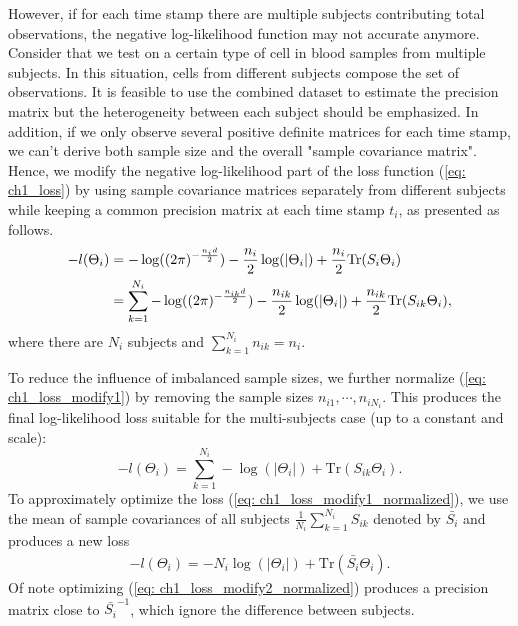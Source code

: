 However, if for each time stamp there are multiple subjects contributing total observations, 
the negative log-likelihood function may not accurate anymore. 
Consider that we test on a certain type of cell in blood samples from multiple subjects. 
In this situation, cells from different subjects compose the set of observations. 
It is feasible to use the combined dataset to estimate the precision matrix but the heterogeneity between each subject should be emphasized. 
In addition, if we only observe several positive definite matrices for each time stamp, 
we can't derive both sample size and the overall "sample covariance matrix". 
Hence, we modify the negative log-likelihood part of the loss function (\ref{eq: ch1_loss}) by 
using sample covariance matrices separately from different subjects while keeping a common precision matrix at each time stamp $t_i$,  
as presented as follows. 
\begin{align}
    \label{eq: ch1_loss_modify1}
    -l(\Theta_i) &= -\log((2\pi)^{-\frac{n_id}{2}}) - \frac{n_i}{2}\log(|\Theta_i|) +\frac{n_i}{2}\text{Tr}(S_i\Theta_i) \notag \\
                 &= \sum_{k=1}^{N_i}-\log((2\pi)^{-\frac{n_{ik}d}{2}})-\frac{n_{ik}}{2}\log(|\Theta_i|)+\frac{n_{ik}}{2}\text{Tr}(S_{ik}\Theta_i),
\end{align}
where there are $N_i$ subjects and $\sum_{k=1}^{N_i}n_{ik}=n_i$.

To reduce the influence of imbalanced sample sizes, 
we further normalize (\ref{eq: ch1_loss_modify1}) by removing the sample sizes $n_{i1},\cdots,n_{iN_i}$. 
This produces the final log-likelihood loss suitable for the multi-subjects case (up to a constant and scale): 
\begin{equation}
    \label{eq: ch1_loss_modify1_normalized}
    -l(\Theta_i) = \sum_{k=1}^{N_i}-\log(|\Theta_i|)+\text{Tr}(S_{ik}\Theta_i).
\end{equation}
To approximately optimize the loss (\ref{eq: ch1_loss_modify1_normalized}), 
we use the mean of sample covariances of all subjects $\frac{1}{N_i}\sum_{k=1}^{N_i}S_{ik}$ denoted by $\bar{S_i}$ and produces a new loss 
\begin{align}
    \label{eq: ch1_loss_modify2_normalized}
    -l(\Theta_i) = -N_i\log(|\Theta_i|)+\text{Tr}(\bar{S_i}\Theta_i).
\end{align}
Of note optimizing (\ref{eq: ch1_loss_modify2_normalized}) produces a precision matrix close to $\bar{S_i}^{-1}$, 
which ignore the difference between subjects.

